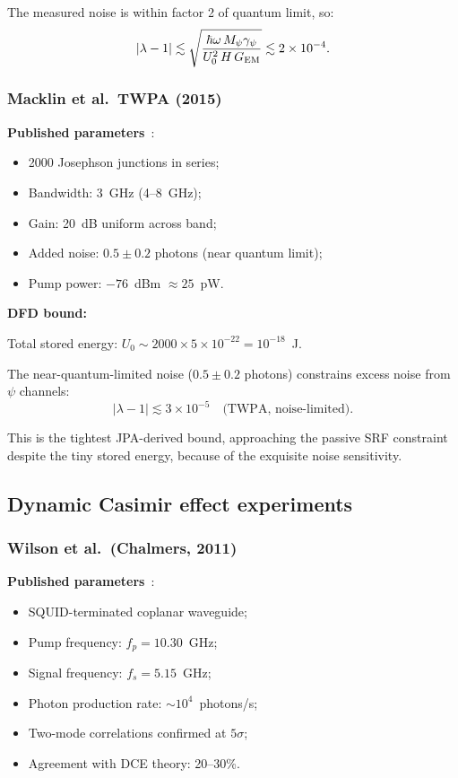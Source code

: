 \documentclass[12pt,aps,prd,twocolumn,superscriptaddress,nofootinbib]{revtex4-2}
\newcommand{\gpsi}{\gamma_\psi}
\newcommand{\Mpsi}{M_\psi}
\begin{document}
The measured noise is within factor 2 of quantum limit, so:
\begin{equation}
|\lambda-1| \lesssim \sqrt{\frac{\hbar\omega\,\Mpsi\gpsi}
{U_0^2\,H\,G_{\rm EM}}}
\lesssim 2\times10^{-4}.
\label{eq:castellanos_bound}
\end{equation}

\subsubsection{Macklin et al.\ TWPA (2015)}
\label{sec:macklin}

\textbf{Published parameters}~\cite{Macklin2015}:
\begin{itemize}[noitemsep]
\item 2000 Josephson junctions in series;
\item Bandwidth: 3~GHz (4--8~GHz);
\item Gain: 20~dB uniform across band;
\item Added noise: $0.5\pm0.2$ photons (near quantum limit);
\item Pump power: $-76$~dBm $\approx 25$~pW.
\end{itemize}

\textbf{DFD bound:}

Total stored energy: $U_0 \sim 2000\times5\times10^{-22}
= 10^{-18}$~J.

The near-quantum-limited noise ($0.5\pm0.2$ photons) constrains
excess noise from $\psi$ channels:
\begin{equation}
|\lambda-1| \lesssim 3\times10^{-5}
\quad\text{(TWPA, noise-limited)}.
\label{eq:twpa_bound}
\end{equation}

This is the tightest JPA-derived bound, approaching the
passive SRF constraint despite the tiny stored energy, because
of the exquisite noise sensitivity.

\subsection{Dynamic Casimir effect experiments}

\subsubsection{Wilson et al.\ (Chalmers, 2011)}
\label{sec:wilson}

\textbf{Published parameters}~\cite{Wilson2011}:
\begin{itemize}[noitemsep]
\item SQUID-terminated coplanar waveguide;
\item Pump frequency: $f_p = 10.30$~GHz;
\item Signal frequency: $f_s = 5.15$~GHz;
\item Photon production rate: $\sim10^4$~photons/s;
\item Two-mode correlations confirmed at $5\sigma$;
\item Agreement with DCE theory: 20--30\%.
\end{itemize}
\end{document}
